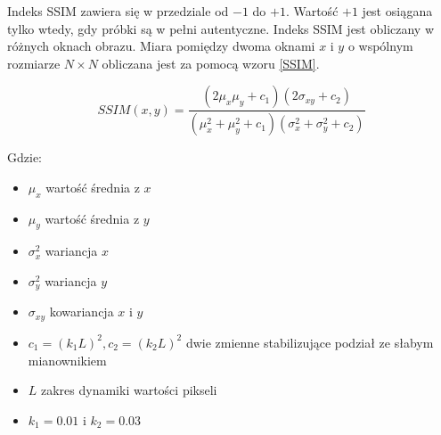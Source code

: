 \documentclass[a4paper,12pt,twoside,openany]{report}
\begin{document}
Indeks SSIM zawiera się w przedziale od $-1$ do $+1$. Wartość $+1$ jest osiągana tylko wtedy, gdy próbki są w pełni autentyczne. Indeks SSIM jest obliczany w różnych oknach obrazu. Miara pomiędzy dwoma oknami $x$ i $y$ o wspólnym rozmiarze $N \times N$ obliczana jest za pomocą wzoru \ref{SSIM}. 

\begin{equation}
	SSIM(x,y)= \frac{(2\mu_x\mu_y+c_1)(2\sigma_{xy}+c_2)}{(\mu_x^2+\mu_y^2+c_1)(\sigma_x^2+\sigma_y^2+c_2)}
	\label{SSIM}
\end{equation}

Gdzie: 
\begin{itemize}
	\item $\mu_x$ wartość średnia z $x$
	\item $\mu_y$ wartość średnia z $y$
	\item $\sigma_x^2$ wariancja $x$
	\item $\sigma_y^2$ wariancja $y$
	\item $\sigma_{xy}$ kowariancja $x$ i $y$
	\item $c_1=(k_1L)^2, c_2=(k_2L)^2$ dwie zmienne stabilizujące podział ze słabym mianownikiem
	\item $L$ zakres dynamiki wartości pikseli 
	\item $k_1=0.01$ i $k_2=0.03$
\end{itemize}


\end{document}
